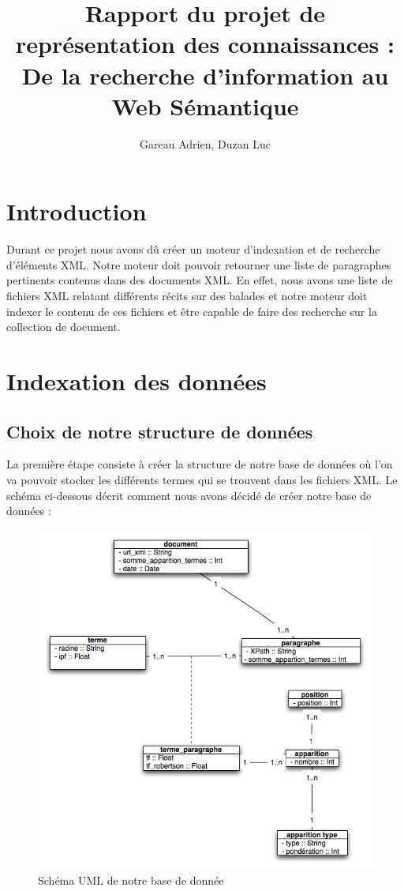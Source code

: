 \documentclass{article}
\title{Rapport du projet de représentation des connaissances :\\
De la recherche d'information au Web Sémantique}
\author{Gareau Adrien, Duzan Luc}
\begin{document}
\maketitle
\section{Introduction}

Durant ce projet nous avons dû créer un moteur d'indexation et de recherche
d'éléments XML. Notre moteur doit pouvoir retourner une liste de paragraphes
pertinents contenus dans des documents XML. En effet, nous avons une liste de
fichiers XML relatant différents récits sur des balades et notre moteur doit indexer
le contenu de ces fichiers et être capable de faire des recherche sur la collection
de document.

\section{Indexation des données}

\subsection{Choix de notre structure de données}
La première étape consiste à créer la structure de notre base de données où l’on va
pouvoir stocker les différents termes qui se trouvent dans les fichiers XML. Le
schéma ci-dessous décrit comment nous avons décidé de créer notre base de données : 

\begin{figure}[h!!]
    \centering
    \caption{\label{schéma UML de notre base de donnée} Schéma UML de notre base de
donnée}
    \includegraphics[scale=0.7]{schema_db.png}
\end{figure}
\end{document}
